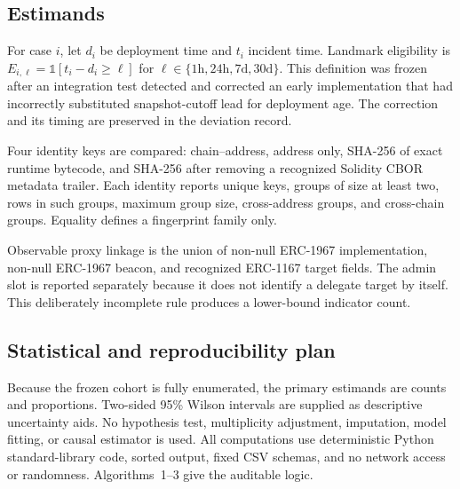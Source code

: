\documentclass[10pt]{article}
\begin{document}
\subsection{Estimands}
For case $i$, let $d_i$ be deployment time and $t_i$ incident time. Landmark eligibility is $E_{i,\ell}=\mathbb{1}[t_i-d_i\geq\ell]$ for $\ell\in\{1\mathrm{h},24\mathrm{h},7\mathrm{d},30\mathrm{d}\}$. This definition was frozen after an integration test detected and corrected an early implementation that had incorrectly substituted snapshot-cutoff lead for deployment age. The correction and its timing are preserved in the deviation record.

Four identity keys are compared: chain--address, address only, SHA-256 of exact runtime bytecode, and SHA-256 after removing a recognized Solidity CBOR metadata trailer. Each identity reports unique keys, groups of size at least two, rows in such groups, maximum group size, cross-address groups, and cross-chain groups. Equality defines a fingerprint family only.

Observable proxy linkage is the union of non-null ERC-1967 implementation, non-null ERC-1967 beacon, and recognized ERC-1167 target fields. The admin slot is reported separately because it does not identify a delegate target by itself. This deliberately incomplete rule produces a lower-bound indicator count.

\subsection{Statistical and reproducibility plan}
Because the frozen cohort is fully enumerated, the primary estimands are counts and proportions. Two-sided 95\% Wilson intervals are supplied as descriptive uncertainty aids. No hypothesis test, multiplicity adjustment, imputation, model fitting, or causal estimator is used. All computations use deterministic Python standard-library code, sorted output, fixed CSV schemas, and no network access or randomness. Algorithms~1--3 give the auditable logic.
\end{document}
